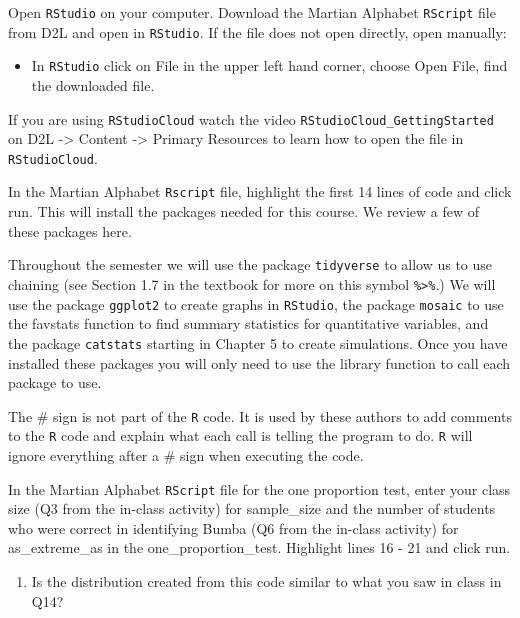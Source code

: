 \documentclass[
]{report}
\providecommand{\tightlist}{%
  \setlength{\itemsep}{0pt}\setlength{\parskip}{0pt}}
\begin{document}
Open \texttt{RStudio} on your computer. Download the Martian Alphabet \texttt{RScript} file from D2L and open in \texttt{RStudio}. If the file does not open directly, open manually:

\begin{itemize}
\tightlist
\item
  In \texttt{RStudio} click on File in the upper left hand corner, choose Open File, find the downloaded file.
\end{itemize}

If you are using \texttt{RStudioCloud} watch the video \texttt{RStudioCloud\_GettingStarted} on D2L -\textgreater{} Content -\textgreater{} Primary Resources to learn how to open the file in \texttt{RStudioCloud}.

In the Martian Alphabet \texttt{Rscript} file, highlight the first 14 lines of code and click run. This will install the packages needed for this course. We review a few of these packages here.

Throughout the semester we will use the package \texttt{tidyverse} to allow us to use chaining (see Section 1.7 in the textbook for more on this symbol \texttt{\%\textgreater{}\%}.) We will use the package \texttt{ggplot2} to create graphs in \texttt{RStudio}, the package \texttt{mosaic} to use the favstats function to find summary statistics for quantitative variables, and the package \texttt{catstats} starting in Chapter 5 to create simulations. Once you have installed these packages you will only need to use the library function to call each package to use.

The \# sign is not part of the \texttt{R} code.
It is used by these authors to add comments to the \texttt{R} code and explain what each call is telling the program to do.
\texttt{R} will ignore everything after a \# sign when executing the code.

In the Martian Alphabet \texttt{RScript} file for the one proportion test, enter your class size (Q3 from the in-class activity) for sample\_size and the number of students who were correct in identifying Bumba (Q6 from the in-class activity) for as\_extreme\_as in the one\_proportion\_test. Highlight lines 16 - 21 and click run.

\begin{enumerate}
\def\labelenumi{\arabic{enumi}.}
\setcounter{enumi}{3}
\tightlist
\item
  Is the distribution created from this code similar to what you saw in class in Q14?
\end{enumerate}
\end{document}
